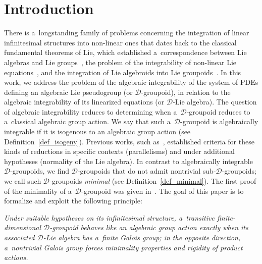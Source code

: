 \documentclass[pdftex]{sigma}
\numberwithin{equation}{section}
\theoremstyle{definition}
\begin{document}


\renewcommand{\thefootnote}{\arabic{footnote}}
\setcounter{footnote}{0}

\section{Introduction}\label{sec1}

There is a~longstanding family of problems concerning the integration of linear infinitesimal structures into non-linear ones that dates back to the classical fundamental theorems of Lie, which established a~correspondence between Lie algebras and Lie groups~\cite{Lie1893}, the problem of the integrability of non-linear Lie equations~\cite{kumpera1972lie, munoz2000integrability,rodrigues1962first}, and the integration of Lie algebroids into Lie groupoids~\cite{crainic2003integrability}. In this work, we address the problem of the algebraic integrability of the system of PDEs defining an algebraic Lie pseudogroup (or $\mathcal{D}$-groupoid), in relation to the algebraic integrability of its linearized equations (or $\mathcal{D}$-Lie algebra). The question of algebraic integrability reduces to determining when a~$\mathcal{D}$-groupoid reduces to a~classical algebraic group action. We say that such a~$\mathcal{D}$-groupoid is algebraically integrable if it is isogenous to an algebraic group action (see Definition~\ref{def_isogeny}). Previous works, such as~\cite{bc2017}, established criteria for these kinds of reductions in specific contexts (parallelisms) and under additional hypotheses (normality of the Lie algebra). In contrast to algebraically integrable $\mathcal{D}$-groupoids, we find $\mathcal{D}$-groupoids that do not admit nontrivial sub-$\mathcal{D}$-groupoids; we call such $\mathcal{D}$-groupoids \textit{minimal} (see Definition~\ref{def_minimal}). The first proof of the minimality of a~$\mathcal{D}$-groupoid was given in~\cite{Casale_BlazquezSanz_ArenasTirado_2025}. The goal of this paper is to formalize and exploit the following principle:

\textit{Under suitable hypotheses on its infinitesimal structure, a~transitive finite-dimensional $\mathcal{D}$-groupoid behaves like an algebraic group action exactly when its associated $\mathcal D$-Lie algebra has a~finite Galois group; in the opposite direction, a~nontrivial Galois group forces minimality properties and rigidity of product actions.}
\end{document}
